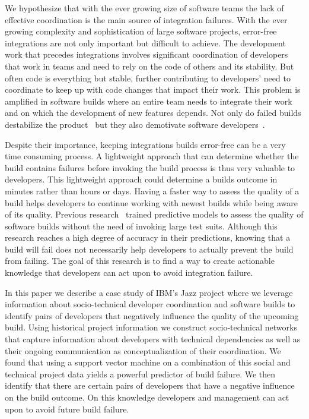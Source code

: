 \label{chap:stc-net}
We hypothesize that with the ever growing size of software teams the lack of
effective coordination is the main source of integration failures.  With the
ever growing complexity and sophistication of large software projects,
error-free integrations are not only important but difficult to achieve. The
development work that precedes integrations involves significant coordination of
developers that work in teams and need to rely on the code of others and its
stability. But often code is everything but stable, further contributing to
developers' need to coordinate to keep up with code changes that impact their work. This problem is
amplified in software builds where an entire team needs to integrate their work
and on which the development of new features depends. Not only do
failed builds destabilize the product~\cite{cusumano1997} but they also demotivate
software developers~\cite{holck2004}.

Despite their importance, keeping integrations builds error-free can be a very time consuming
process. A lightweight approach that can determine whether the build contains
failures before invoking the build process is thus very valuable to developers.
This lightweight approach could determine a builds outcome in minutes rather than hours or days. Having a faster way to
assess the quality of a build helps developers to continue working with newest
builds while being aware of its quality. Previous
research~\cite{wolf:icse:2009,hassan:ase:2006} trained predictive models to assess the quality of software builds without the need of invoking large test
suits. Although this research
reaches a high degree of accuracy in their predictions, knowing that a
build will fail does not necessarily help developers to actually prevent
the build from failing.
The goal of this research is to find a way to create actionable knowledge that
developers can act upon to avoid
integration failure.

In this paper we describe a case study of IBM's Jazz project where we leverage
information about socio-technical developer coordination and software builds to
identify pairs of developers that negatively influence the quality of the
upcoming build. Using historical project information we construct socio-technical
networks that capture information about developers with technical dependencies
as well as their ongoing communication as conceptualization of their coordination.
We found that using a support vector machine on a combination of this social
and technical project data yields a powerful predictor of build failure. We
then identify that there are certain pairs of developers that have a
negative influence on the build outcome. On this knowledge developers and management can
act upon to avoid future build failure.

